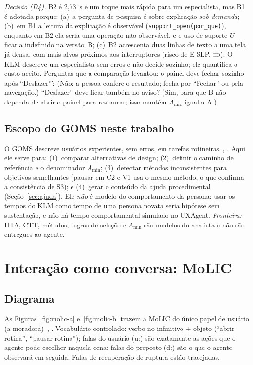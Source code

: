 \documentclass[conference,onecolumn]{IEEEtran}
\newcommand{\stHO}{\textsc{ho}}
\newcommand{\ev}[1]{\texttt{#1}}
\begin{document}
\textit{Decisão (D4).} B2 é 2,73~s e um toque mais rápida para um especialista, mas B1 é adotada porque: (a)~a pergunta de pesquisa é sobre explicação \textit{sob demanda}; (b)~em B1 a leitura da explicação é observável (\ev{support\_open(por\_que)}), enquanto em B2 ela seria uma operação não observável, e o uso de suporte $U$ ficaria indefinido na versão~B; (c)~B2 acrescenta duas linhas de texto a uma tela já densa, com mais alvos próximos aos interruptores (risco de E-SLP, \stHO). O KLM descreve um especialista sem erros e não decide sozinho; ele quantifica o custo aceito. Perguntas que a comparação levantou: o painel deve fechar sozinho após ``Desfazer''? (Não: a pessoa confere o resultado; fecha por ``Fechar'' ou pela navegação.) ``Desfazer'' deve ficar também no aviso? (Sim, para que B não dependa de abrir o painel para restaurar; isso mantém $A_{\min}$ igual a A.)

\subsection{Escopo do GOMS neste trabalho}
O GOMS descreve usuários experientes, sem erros, em tarefas rotineiras~\cite{barbosa2010}, \cite{preece2002}. Aqui ele serve para: (1)~comparar alternativas de design; (2)~definir o caminho de referência e o denominador $A_{\min}$; (3)~detectar métodos inconsistentes para objetivos semelhantes (pausar em C2 e V1 usa o mesmo método, o que confirma a consistência de S3); e (4)~gerar o conteúdo da ajuda procedimental (Seção~\ref{sec:ajuda}). Ele \textit{não} é modelo do comportamento da persona: usar os tempos do KLM como tempo de uma persona novata seria hipótese sem sustentação, e não há tempo comportamental simulado no UXAgent. \textit{Fronteira:} HTA, CTT, métodos, regras de seleção e $A_{\min}$ são modelos do analista e não são entregues ao agente.

\section{Interação como conversa: MoLIC}\label{sec:molic}

\subsection{Diagrama}
As Figuras~\ref{fig:molic-a} e~\ref{fig:molic-b} trazem a MoLIC do único papel de usuário (a moradora)~\cite{barbosa2003molic}, \cite{barbosa2010}. Vocabulário controlado: verbo no infinitivo + objeto (``abrir rotina'', ``pausar rotina''); falas do usuário (u:) são exatamente as ações que o agente pode escolher naquela cena; falas do preposto (d:) são o que o agente observará em seguida. Falas de recuperação de ruptura estão tracejadas.
\end{document}
